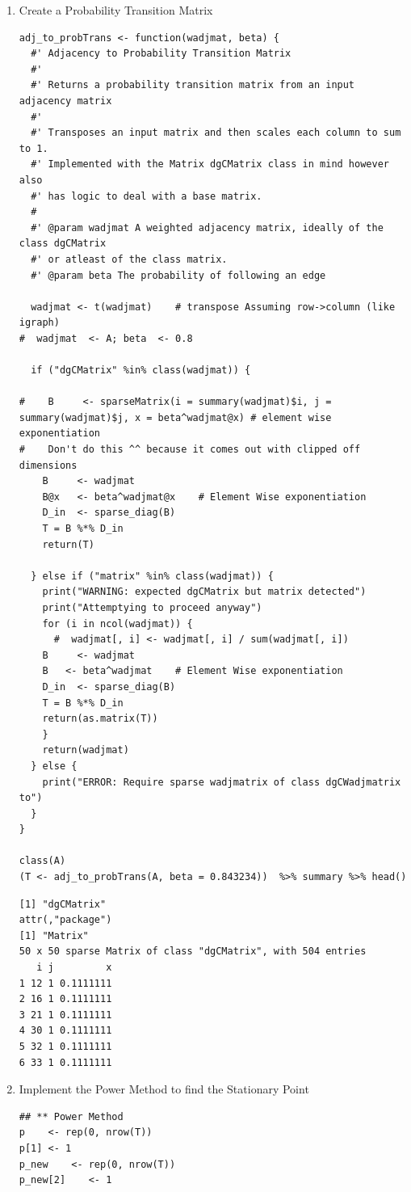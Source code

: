 \documentclass[11pt]{article}
\begin{document}
\begin{enumerate}
\lstset{language=r,label= ,caption= ,captionpos=b,numbers=none}
\begin{lstlisting}
weight_adjMat <- function(adjMat) {
  #' Weight Adjacency Matrix
  #'
  #' Randomly weights an adjacency matrix so that terms
  #' are Real (as opposed to natural) values.
  A@x*rnorm(length(A@x), 0, 0.1)
}
\end{lstlisting}

\item Create a Probability Transition Matrix
\label{sec:org11dd118}
\lstset{language=r,label= ,caption= ,captionpos=b,numbers=none}
\begin{lstlisting}
adj_to_probTrans <- function(wadjmat, beta) {
  #' Adjacency to Probability Transition Matrix
  #'
  #' Returns a probability transition matrix from an input adjacency matrix
  #'
  #' Transposes an input matrix and then scales each column to sum to 1.
  #' Implemented with the Matrix dgCMatrix class in mind however also
  #' has logic to deal with a base matrix.
  #
  #' @param wadjmat A weighted adjacency matrix, ideally of the class dgCMatrix
  #' or atleast of the class matrix.
  #' @param beta The probability of following an edge

  wadjmat <- t(wadjmat)    # transpose Assuming row->column (like igraph)
#  wadjmat  <- A; beta  <- 0.8

  if ("dgCMatrix" %in% class(wadjmat)) {

#    B     <- sparseMatrix(i = summary(wadjmat)$i, j = summary(wadjmat)$j, x = beta^wadjmat@x) # element wise exponentiation
#    Don't do this ^^ because it comes out with clipped off dimensions
    B     <- wadjmat
    B@x   <- beta^wadjmat@x    # Element Wise exponentiation
    D_in  <- sparse_diag(B)
    T = B %*% D_in
    return(T)

  } else if ("matrix" %in% class(wadjmat)) {
    print("WARNING: expected dgCMatrix but matrix detected")
    print("Attemptying to proceed anyway")
    for (i in ncol(wadjmat)) {
      #  wadjmat[, i] <- wadjmat[, i] / sum(wadjmat[, i])
    B     <- wadjmat
    B   <- beta^wadjmat    # Element Wise exponentiation
    D_in  <- sparse_diag(B)
    T = B %*% D_in
    return(as.matrix(T))
    }
    return(wadjmat)
  } else {
    print("ERROR: Require sparse wadjmatrix of class dgCWadjmatrix to")
  }
}

class(A)
(T <- adj_to_probTrans(A, beta = 0.843234))  %>% summary %>% head()
\end{lstlisting}

\begin{verbatim}
[1] "dgCMatrix"
attr(,"package")
[1] "Matrix"
50 x 50 sparse Matrix of class "dgCMatrix", with 504 entries
   i j         x
1 12 1 0.1111111
2 16 1 0.1111111
3 21 1 0.1111111
4 30 1 0.1111111
5 32 1 0.1111111
6 33 1 0.1111111
\end{verbatim}
\item Implement the Power Method to find the Stationary Point
\label{sec:orgf34c505}
\lstset{language=r,label= ,caption= ,captionpos=b,numbers=none}
\begin{lstlisting}
## ** Power Method
p    <- rep(0, nrow(T))
p[1] <- 1
p_new    <- rep(0, nrow(T))
p_new[2]    <- 1


\end{lstlisting}
\end{enumerate}
\end{document}
